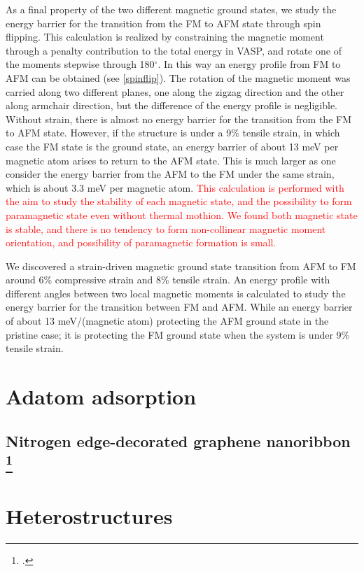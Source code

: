 As a final property of the two different magnetic ground states, we study the energy barrier for the transition from the FM to AFM state through spin flipping. This calculation is realized by constraining the magnetic moment through a penalty contribution to the total energy in VASP, and rotate one of the moments stepwise through 180$^{\circ}$.  In this way an energy profile from FM to AFM can be obtained (see \autoref{spinflip}). The rotation of the magnetic moment was carried along two different planes, one along the zigzag direction and the other along armchair direction, but the difference of the energy profile is negligible. Without strain, there is almost no energy barrier for the transition from the FM to AFM state. However, if the structure is under a 9\% tensile strain, in which case the FM state is the ground state, an energy barrier of about 13 meV per magnetic atom arises to return to the AFM state. This is much larger as one consider the energy barrier from the AFM to the FM under the same strain, which is about 3.3 meV per magnetic atom. \textcolor{red}{This calculation is performed with the aim to study the stability of each magnetic state, and the possibility to form paramagnetic state even without thermal mothion. We found both magnetic state is stable, and there is no tendency to form non-collinear magnetic moment orientation, and possibility of paramagnetic formation is small.}

We discovered a strain-driven magnetic ground state transition from AFM to FM around  6\% compressive strain and 8\% tensile strain. An energy profile with different angles between two local magnetic moments is calculated to study the energy barrier for the transition between FM and AFM. While an energy barrier of about 13 meV/(magnetic atom) protecting the AFM ground state in the pristine case; it is protecting the FM ground state when the system is under 9\% tensile strain.  

\section{Adatom adsorption}
\subsection[Nitrogen edge-decorated graphene nanoribbon]{Nitrogen edge-decorated graphene nanoribbon \footcite[This work will be published as:][]{Aierken2017.GNR}}

\section{Heterostructures}
